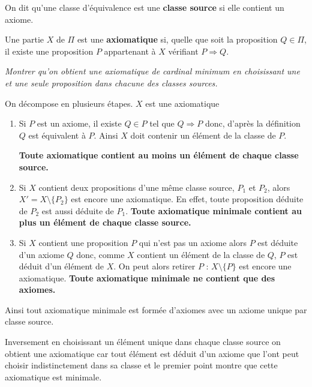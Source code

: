 \medskip

On dit qu'une classe d'équivalence est une {\bf classe source} si elle contient un axiome.
    
Une partie $X$ de $\Pi$ est une {\bf axiomatique} si, quelle que soit la proposition $Q\in \Pi$, il existe une proposition $P$ appartenant à $X$ vérifiant $P \Rightarrow Q$.
\begin{Exercise}\it
Montrer qu'on obtient une axiomatique de cardinal minimum  en choisissant une et une seule proposition dans chacune des classes sources. 
\end{Exercise}
\begin{Answer} On décompose en plusieurs étapes. $X$ est une axiomatique

\begin{enumerate}
    \item Si $P$ est un axiome, il existe $Q\in P$ tel que $Q\Rightarrow P$ donc, d'après la définition $Q$ est équivalent à $P$. Ainsi $X$ doit contenir un élément de la classe de $P$.
    
    {\bf Toute axiomatique contient au moins un élément de chaque classe source.}
    \item Si $X$ contient deux propositions d'une même classe source, $P_1$ et $P_2$, alors $X' = X\setminus \{P_2\}$ est encore une axiomatique. En effet, toute proposition déduite de $P_2$ est aussi déduite de $P_1$.
    {\bf Toute axiomatique minimale contient au plus un élément de chaque classe source.}
    \item Si $X$ contient une proposition $P$ qui n'est pas un axiome  alors $P$ est déduite d'un axiome $Q$ donc, comme $X$ contient un élément de la classe de $Q$, $P$ est déduit d'un élément de $X$. On peut alors retirer $P$ : $X\setminus \{P\}$ est encore une axiomatique.
        {\bf Toute axiomatique minimale ne contient que des axiomes.}
\end{enumerate}

Ainsi tout axiomatique minimale est formée d'axiomes avec un axiome unique par classe source.

Inversement en choisissant un élément unique dans chaque classe source on obtient une axiomatique car tout élément est déduit d'un axiome que l'ont peut choisir indistinctement dans sa classe et le premier point montre que cette axiomatique est minimale.
\end{Answer}

